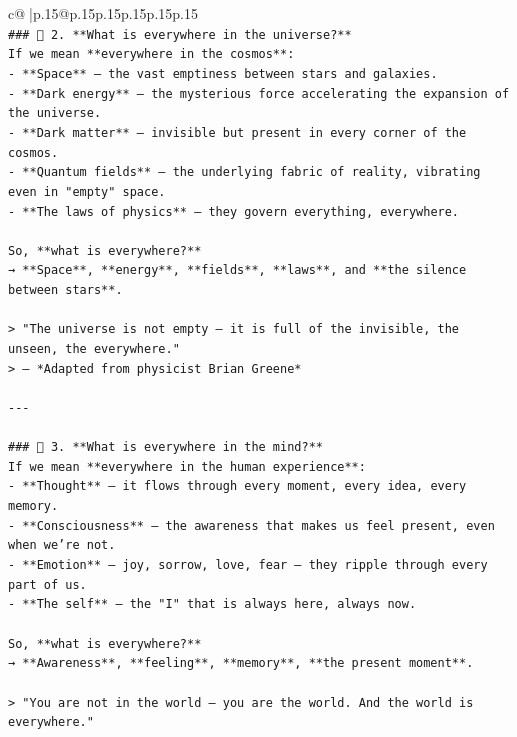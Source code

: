 \documentclass{article}
\begin{document}
{\begin{supertabular}{c@{$\;$}|p{.15\linewidth}@{}p{.15\linewidth}p{.15\linewidth}p{.15\linewidth}p{.15\linewidth}p{.15\linewidth}}
{{{\\ 
\texttt{\#\#\# 🌌 2. **What is everywhere in the universe?**} \\
\texttt{If we mean **everywhere in the cosmos**:} \\
\texttt{{-} **Space** — the vast emptiness between stars and galaxies.} \\
\texttt{{-} **Dark energy** — the mysterious force accelerating the expansion of the universe.} \\
\texttt{{-} **Dark matter** — invisible but present in every corner of the cosmos.} \\
\texttt{{-} **Quantum fields** — the underlying fabric of reality, vibrating even in "empty" space.} \\
\texttt{{-} **The laws of physics** — they govern everything, everywhere.} \\
\\ 
\texttt{So, **what is everywhere?**  } \\
\texttt{→ **Space**, **energy**, **fields**, **laws**, and **the silence between stars**.} \\
\\ 
\texttt{> "The universe is not empty — it is full of the invisible, the unseen, the everywhere."  } \\
\texttt{> — *Adapted from physicist Brian Greene*} \\
\\ 
\texttt{{-}{-}{-}} \\
\\ 
\texttt{\#\#\# 🧠 3. **What is everywhere in the mind?**} \\
\texttt{If we mean **everywhere in the human experience**:} \\
\texttt{{-} **Thought** — it flows through every moment, every idea, every memory.} \\
\texttt{{-} **Consciousness** — the awareness that makes us feel present, even when we’re not.} \\
\texttt{{-} **Emotion** — joy, sorrow, love, fear — they ripple through every part of us.} \\
\texttt{{-} **The self** — the "I" that is always here, always now.} \\
\\ 
\texttt{So, **what is everywhere?**  } \\
\texttt{→ **Awareness**, **feeling**, **memory**, **the present moment**.} \\
\\ 
\texttt{> "You are not in the world — you are the world. And the world is everywhere."  } \\
}}}
\end{supertabular}}
\end{document}
